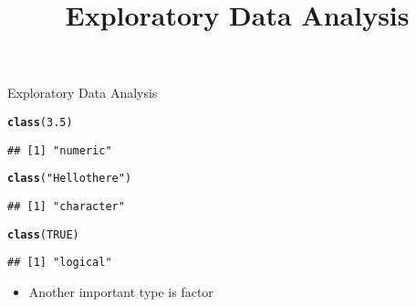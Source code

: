 \documentclass{beamer}\usepackage[]{graphicx}\usepackage[]{color}
\makeatletter
\newcommand{\hlnum}[1]{\textcolor[rgb]{0.686,0.059,0.569}{#1}}%
\newcommand{\hlstr}[1]{\textcolor[rgb]{0.192,0.494,0.8}{#1}}%
\newcommand{\hlstd}[1]{\textcolor[rgb]{0.345,0.345,0.345}{#1}}%
\newcommand{\hlkwd}[1]{\textcolor[rgb]{0.737,0.353,0.396}{\textbf{#1}}}%
\newenvironment{kframe}{%
 \def\at@end@of@kframe{}%
 \ifinner\ifhmode%
  \def\at@end@of@kframe{\end{minipage}}%
  \begin{minipage}{\columnwidth}%
 \fi\fi%
 \def\FrameCommand##1{\hskip\@totalleftmargin \hskip-\fboxsep
 \colorbox{shadecolor}{##1}\hskip-\fboxsep
     \hskip-\linewidth \hskip-\@totalleftmargin \hskip\columnwidth}%
 \MakeFramed {\advance\hsize-\width
   \@totalleftmargin\z@ \linewidth\hsize
   \@setminipage}}%
 {\par\unskip\endMakeFramed%
 \at@end@of@kframe}
\newenvironment{knitrout}{}{} %
\renewenvironment{knitrout}{\begin{singlespace}}{\end{singlespace}}
\theoremstyle{mystyle}
\makeatother
\begin{document}

\title{
Exploratory Data Analysis
}
\author{
}
\date{}

\begin{frame}[fragile]
\titlepage
\end{frame}

\begin{frame}[fragile]{Exploratory Data Analysis}
\begin{knitrout}
\color{fgcolor}\begin{kframe}
\begin{alltt}
\hlkwd{class}\hlstd{(}\hlnum{3.5}\hlstd{)}
\end{alltt}
\begin{verbatim}
## [1] "numeric"
\end{verbatim}
\begin{alltt}
\hlkwd{class}\hlstd{(}\hlstr{"Hello there"}\hlstd{)}
\end{alltt}
\begin{verbatim}
## [1] "character"
\end{verbatim}
\begin{alltt}
\hlkwd{class}\hlstd{(}\hlnum{TRUE}\hlstd{)}
\end{alltt}
\begin{verbatim}
## [1] "logical"
\end{verbatim}
\end{kframe}
\end{knitrout}
\begin{itemize}
\item Another important type is factor
\end{itemize}
\end{frame}
\end{document}
